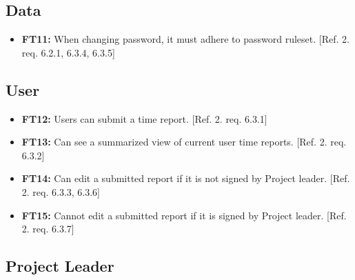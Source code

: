 \documentclass{article}
\begin{document}
		\subsection{Data}
		
		\begin{itemize}
		
  			\item \textbf{FT11:}  When changing password, it must adhere to password ruleset. [Ref. 2. req. 6.2.1, 6.3.4, 6.3.5]

		\end{itemize}
		
		\subsection{User}
		
		\begin{itemize}
  			\item \textbf{FT12:} Users can submit a time report. [Ref. 2. req. 6.3.1]
  			
  			\item \textbf{FT13:} Can see a summarized view of current user time reports. [Ref. 2. req. 6.3.2]
  			
  			\item \textbf{FT14:} Can edit a submitted report if it is not signed by Project leader. [Ref. 2. req. 6.3.3, 6.3.6]
  			
  			 \item \textbf{FT15:} Cannot edit a submitted report if it is signed by Project leader. [Ref. 2. req. 6.3.7]


		\end{itemize}
		
		\subsection{Project Leader}
		
\end{document}

